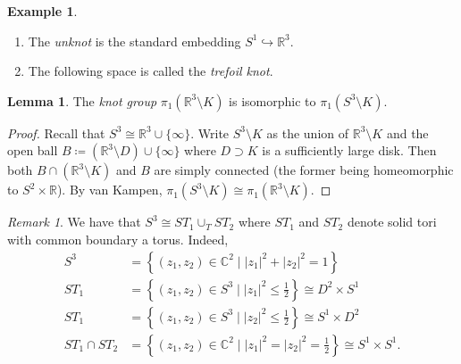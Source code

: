 \documentclass[10pt,letterpaper,cm]{nupset}
\theoremstyle{definition}
\newtheorem{exmp}[definition]{Example}
\theoremstyle{theorem}
\newtheorem{lemma}[definition]{Lemma}
\theoremstyle{remark}
\newtheorem{remark}[definition]{Remark}
\newcommand{\C}{\mathbb C}
\newcommand{\R}{\mathbb{R}}
\newcommand{\1}{\mathbb{1}}
\newcommand{\0}{\vec 0}
\begin{document}
\begin{exmp} $ $
\begin{enumerate}
\item The \textit{unknot} is the standard embedding $S^1 \hookrightarrow \R^3$. 
\item The following space is called the \textit{trefoil knot}.

\end{enumerate}
\end{exmp}

\begin{lemma}
The \textit{knot group} $ \pi_1(\R^3 \setminus K)$ is isomorphic to $\pi_1(S^3 \setminus K)$. 
\end{lemma}
\begin{proof}
Recall that $S^3 \cong \R^3 \cup \{\infty\}$. Write $S^3 \setminus K$ as the union of $\R^3 \setminus K$ and the open ball $B\coloneqq  (\R^3 \setminus D) \cup \{\infty\}$ where $D\supset K$ is a sufficiently large disk. Then both $B \cap (\R^3 \setminus K)$ and $B$ are simply connected (the former being homeomorphic to $S^2 \times \R$). By van Kampen, $\pi_1(S^3 \setminus K) \cong \pi_1(\R^3 \setminus K)$. 
\end{proof}

\medskip

\begin{remark}\label{S3}
We have that $S^3 \cong ST_1 \cup_T ST_2$ where $ST_1$ and $ST_2$ denote solid tori with common boundary a torus. Indeed, 
\begin{align*}
 S^3 & = \left\{(z_1, z_2) \in \C^2 \mid \left\lvert{z_1}\right\rvert^2 + \left\lvert{z_2}\right\rvert^2 =1\right\}
\\  ST_1 &= \left\{(z_1, z_2) \in S^3 \mid \left\lvert{z_1}\right\rvert^2 \leq \frac{1}{2}\right\} \cong D^2 \times S^1
\\  ST_1 &= \left\{(z_1, z_2) \in S^3 \mid \left\lvert{z_2}\right\rvert^2 \leq \frac{1}{2}\right\} \cong S^1 \times D^2
\\  ST_1 \cap ST_2 &= \left\{(z_1, z_2)\in \C^2 \mid \left\lvert{z_1}\right\rvert^2 = \left\lvert{z_2}\right\rvert^2 = \frac{1}{2}\right\} \cong S^1\times S^1
.\end{align*}
\end{remark}
\end{document}
